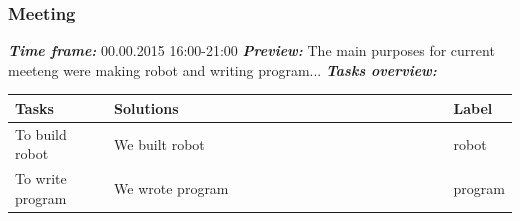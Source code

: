 \addtocounter{number_of_meeting}{1}
\subsubsection{ Meeting}
	\textit{\textbf{Time frame:}} 00.00.2015 16:00-21:00 \newline
	\textit{\textbf{Preview:}} The main purposes for current meeteng were making robot and writing program...\newline \newline
	\textit{\textbf{Tasks overview:}}

  \begin{table}[H]
	\vspace{-2mm}
	\begin{center}
		\begin{tabular}{|p{0.2\linewidth}|p{0.7\linewidth}|p{0.1\linewidth}|}
			\hline
			Tasks & Solutions & Label \\
			\hline
			To build robot & We built robot & robot \\
			\hline
			To write program & We wrote program & program \\
			\hline
		\end{tabular}
	\end{center}
  \end{table}
  
